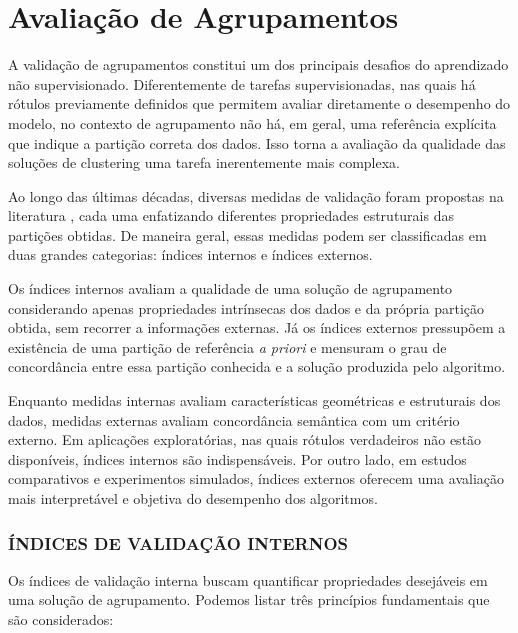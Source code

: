 \chapter{Avaliação de Agrupamentos}
\label{chap:n2_agrupamentos}

A validação de agrupamentos constitui um dos principais desafios do aprendizado não supervisionado. Diferentemente de tarefas supervisionadas, nas quais há rótulos previamente definidos que permitem avaliar diretamente o desempenho do modelo, no contexto de agrupamento não há, em geral, uma referência explícita que indique a partição correta dos dados. Isso torna a avaliação da qualidade das soluções de clustering uma tarefa inerentemente mais complexa.

Ao longo das últimas décadas, diversas medidas de validação foram propostas na literatura \cite{wu2020decision,WOS:000172252500002,WOS:000232704100004,deborah2010survey}, cada uma enfatizando diferentes propriedades estruturais das partições obtidas. De maneira geral, essas medidas podem ser classificadas em duas grandes categorias: índices internos e índices externos.

Os índices internos avaliam a qualidade de uma solução de agrupamento considerando apenas propriedades intrínsecas dos dados e da própria partição obtida, sem recorrer a informações externas. Já os índices externos pressupõem a existência de uma partição de referência \emph{a priori} e mensuram o grau de concordância entre essa partição conhecida e a solução produzida pelo algoritmo.

Enquanto medidas internas avaliam características geométricas e estruturais dos dados, medidas externas avaliam concordância semântica com um critério externo. Em aplicações exploratórias, nas quais rótulos verdadeiros não estão disponíveis, índices internos são indispensáveis. Por outro lado, em estudos comparativos e experimentos simulados, índices externos oferecem uma avaliação mais interpretável e objetiva do desempenho dos algoritmos.

\subsection{ÍNDICES DE VALIDAÇÃO INTERNOS}

Os índices de validação interna buscam quantificar propriedades desejáveis em uma solução de agrupamento. Podemos listar três princípios fundamentais que são considerados:


